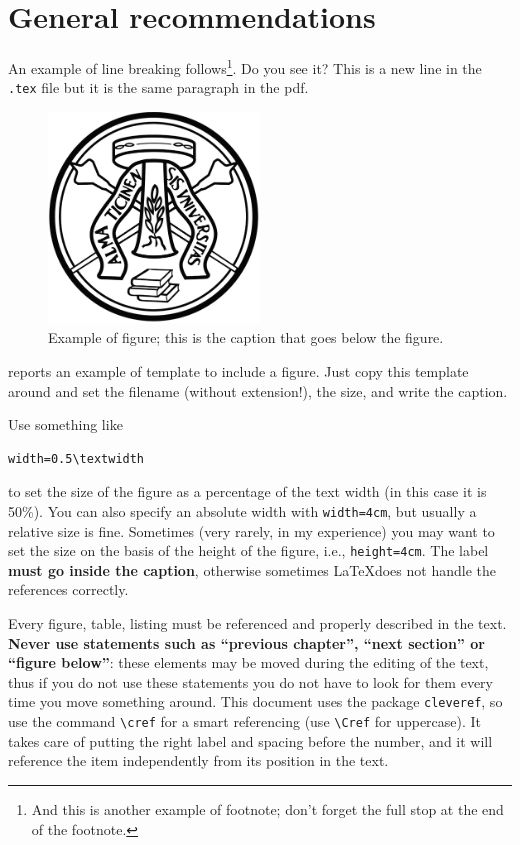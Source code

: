 \section{General recommendations}
\label{s:example_section}

An example of line breaking follows\footnote{And this is another example of footnote; don't forget the full stop at the end of the footnote.}.
Do you see it? This is a new line in the \texttt{.tex} file but it is the same paragraph in the pdf.

\begin{figure}
\centering
\includegraphics[width=0.5\textwidth]{figs/logo-unipv-bw}
\caption[This is the text that goes in the list of figures]{Example of figure; this is the caption that goes below the figure.\label{f:logo}}
\end{figure}

 reports an example of template to include a figure.
Just copy this template around and set the filename (without extension!), the size, and write the caption.

Use something like

\begin{verbatim}
width=0.5\textwidth
\end{verbatim}

to set the size of the figure as a percentage of the text width (in this case it is 50\%).
You can also specify an absolute width with \texttt{width=4cm}, but usually a relative size is fine.
Sometimes (very rarely, in my experience) you may want to set the size on the basis of the height of the figure, i.e., \texttt{height=4cm}.
The label \textbf{must go inside the caption}, otherwise sometimes \LaTeX does not handle the references correctly.

Every figure, table, listing must be referenced and properly described in the text.
\textbf{Never use statements such as \enquote{previous chapter}, \enquote{next section} or \enquote{figure below}}: these elements may be moved during the editing of the text, thus if you do not use these statements you do not have to look for them every time you move something around.
This document uses the package \texttt{cleveref}, so use the command \texttt{\textbackslash cref} for a smart referencing (use \texttt{\textbackslash Cref} for uppercase).
It takes care of putting the right label and spacing before the number, and it will reference the item independently from its position in the text.

